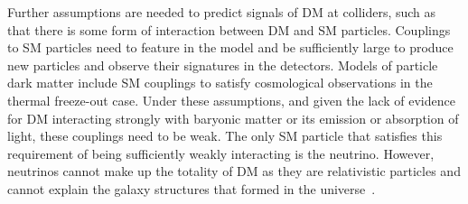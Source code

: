 

Further assumptions are needed to predict signals of DM at colliders, such as that there is some form of interaction between DM and SM particles. 
Couplings to SM particles need to feature in the model and be sufficiently large to produce new particles and observe their signatures in the detectors. 
Models of particle dark matter include SM couplings to satisfy cosmological observations in the thermal freeze-out case. 
Under these assumptions, and given the lack of evidence for DM interacting strongly with baryonic matter or its emission or absorption of light, these couplings need to be weak. 
The only SM particle that satisfies this requirement of being sufficiently weakly interacting is the neutrino.
However, neutrinos cannot make up the totality of DM as they are relativistic particles and cannot explain the galaxy structures that formed in the  universe~\cite{PlehnLecturesDM}. 


